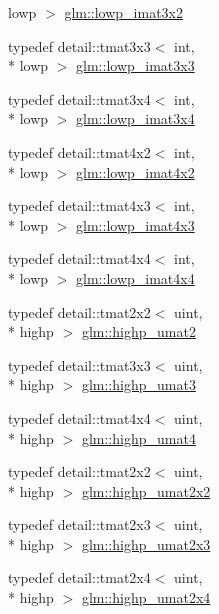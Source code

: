 \begin{DoxyCompactItemize}
lowp $>$ \hyperlink{group__gtc__matrix__integer_ga250780f2be05f698b881b04ba7ce0452}{glm\-::lowp\-\_\-imat3x2}
\item 
typedef detail\-::tmat3x3$<$ int, \\*
lowp $>$ \hyperlink{group__gtc__matrix__integer_gae0d6068aaf9b1f8f06c6cc32941f9471}{glm\-::lowp\-\_\-imat3x3}
\item 
typedef detail\-::tmat3x4$<$ int, \\*
lowp $>$ \hyperlink{group__gtc__matrix__integer_gaba7c2c9f782278aaa10dad882d73ef0d}{glm\-::lowp\-\_\-imat3x4}
\item 
typedef detail\-::tmat4x2$<$ int, \\*
lowp $>$ \hyperlink{group__gtc__matrix__integer_ga0d7055814ab969df3b844ba9c52dbf61}{glm\-::lowp\-\_\-imat4x2}
\item 
typedef detail\-::tmat4x3$<$ int, \\*
lowp $>$ \hyperlink{group__gtc__matrix__integer_ga73858cf965b0aa7e72908eb817c192d6}{glm\-::lowp\-\_\-imat4x3}
\item 
typedef detail\-::tmat4x4$<$ int, \\*
lowp $>$ \hyperlink{group__gtc__matrix__integer_ga92339a0b053a721e3b88267e6d175014}{glm\-::lowp\-\_\-imat4x4}
\item 
typedef detail\-::tmat2x2$<$ uint, \\*
highp $>$ \hyperlink{group__gtc__matrix__integer_ga0c89800e3f63f82da4a4159004811cec}{glm\-::highp\-\_\-umat2}
\item 
typedef detail\-::tmat3x3$<$ uint, \\*
highp $>$ \hyperlink{group__gtc__matrix__integer_ga2a271939d0123103f088e325e5123385}{glm\-::highp\-\_\-umat3}
\item 
typedef detail\-::tmat4x4$<$ uint, \\*
highp $>$ \hyperlink{group__gtc__matrix__integer_gaf12f0d2744e809e64469d27ef392aa98}{glm\-::highp\-\_\-umat4}
\item 
typedef detail\-::tmat2x2$<$ uint, \\*
highp $>$ \hyperlink{group__gtc__matrix__integer_ga428410468e33d16dc8aee08b17166669}{glm\-::highp\-\_\-umat2x2}
\item 
typedef detail\-::tmat2x3$<$ uint, \\*
highp $>$ \hyperlink{group__gtc__matrix__integer_ga309076d055b5511a7071ebb5f660ed83}{glm\-::highp\-\_\-umat2x3}
\item 
typedef detail\-::tmat2x4$<$ uint, \\*
highp $>$ \hyperlink{group__gtc__matrix__integer_gabe8572c228aecc0bfa7ba92415b1c651}{glm\-::highp\-\_\-umat2x4}

\end{DoxyCompactItemize}
